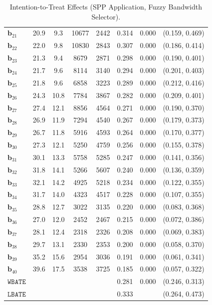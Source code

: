 \documentclass[10pt]{article}
\newcommand{\bb}{\mathbf{b}}
\begin{document}
\begin{table}[p]
\begin{tabular}{lccccccc}
   $\bb_{21}$ & 20.9 & 9.3 & 10677 & 2442 & 0.314 & 0.000 & (0.159, 0.469)\\
   $\bb_{22}$ & 22.0 & 9.8 & 10830 & 2843 & 0.307 & 0.000 & (0.186, 0.414)\\
   $\bb_{23}$ & 21.3 & 9.4 & 8679 & 2871 & 0.298 & 0.000 & (0.190, 0.401)\\
   $\bb_{24}$ & 21.7 & 9.6 & 8114 & 3140 & 0.294 & 0.000 & (0.201, 0.403)\\
   $\bb_{25}$ & 21.8 & 9.6 & 6858 & 3223 & 0.289 & 0.000 & (0.212, 0.416)\\
   $\bb_{26}$ & 24.3 & 10.8 & 7784 & 3867 & 0.282 & 0.000 & (0.209, 0.401)\\
   $\bb_{27}$ & 27.4 & 12.1 & 8856 & 4564 & 0.271 & 0.000 & (0.190, 0.370)\\
   $\bb_{28}$ & 26.9 & 11.9 & 7294 & 4540 & 0.267 & 0.000 & (0.179, 0.373)\\
   $\bb_{29}$ & 26.7 & 11.8 & 5916 & 4593 & 0.264 & 0.000 & (0.170, 0.377)\\
   $\bb_{30}$ & 27.3 & 12.1 & 5250 & 4759 & 0.256 & 0.000 & (0.155, 0.378)\\
   $\bb_{31}$ & 30.1 & 13.3 & 5758 & 5285 & 0.247 & 0.000 & (0.141, 0.356)\\
   $\bb_{32}$ & 31.8 & 14.1 & 5266 & 5607 & 0.240 & 0.000 & (0.136, 0.359)\\
   $\bb_{33}$ & 32.1 & 14.2 & 4925 & 5218 & 0.234 & 0.000 & (0.122, 0.355)\\
   $\bb_{34}$ & 31.7 & 14.0 & 4323 & 4517 & 0.228 & 0.000 & (0.107, 0.355)\\
   $\bb_{35}$ & 28.8 & 12.7 & 3022 & 3135 & 0.220 & 0.000 & (0.083, 0.368)\\
   $\bb_{36}$ & 27.0 & 12.0 & 2452 & 2467 & 0.215 & 0.000 & (0.072, 0.386)\\
   $\bb_{37}$ & 28.1 & 12.4 & 2318 & 2326 & 0.208 & 0.000 & (0.069, 0.383)\\
   $\bb_{38}$ & 29.7 & 13.1 & 2330 & 2353 & 0.200 & 0.000 & (0.058, 0.370)\\
   $\bb_{39}$ & 35.2 & 15.6 & 2954 & 3036 & 0.191 & 0.000 & (0.061, 0.341)\\
   $\bb_{40}$ & 39.6 & 17.5 & 3538 & 3725 & 0.185 & 0.000 & (0.057, 0.322)\\
  \midrule
   $\mathtt{WBATE}$ &  &  &  &  & 0.281 & 0.000 & (0.246, 0.313)\\
  \midrule
   $\mathtt{LBATE}$ &  &  &  &  & 0.333 &  & (0.264, 0.473)\\
  \bottomrule\bottomrule
\end{tabular}

    \caption{Intention-to-Treat Effects (SPP Application, Fuzzy Bandwidth Selector).}
    \label{tab:sa-empapp_main_itt_bwmain}
\end{table}
\end{document}

